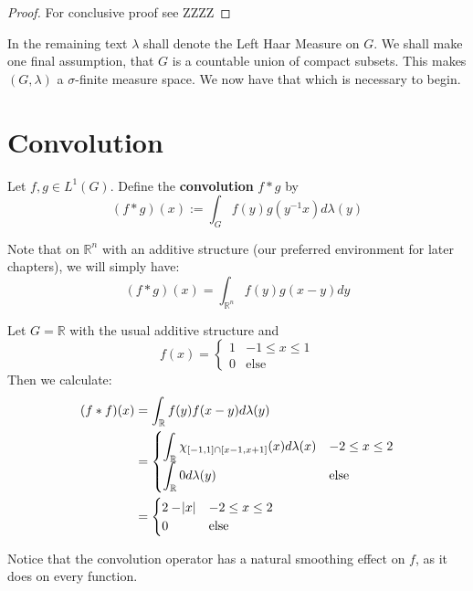 \begin{proof}
For conclusive proof see ZZZZ
\end{proof}

In the remaining text $\lambda$ shall denote the Left Haar Measure on $G$. We shall make one final assumption, that $G$ is a countable union of compact subsets. This makes $(G,\lambda)$ a $\sigma$-finite measure space. We now have that which is necessary to begin.
	
\section{Convolution}

\begin{definition}
 Let $f,g \in L^1(G)$. Define the \textbf{convolution} $f*g$ by
\begin{equation}
 (f*g)(x) := \int_G f(y)g(y^{-1}x) d\lambda(y)
\end{equation}
\end{definition}

\begin{remark}
Note that on $\mathbb{R}^n$ with an additive structure (our preferred environment for later chapters), we will simply have:
\begin{equation*}
 (f*g)(x) = \int_{\mathbb{R}^n} f(y)g(x-y) dy
\end{equation*}
\end{remark}

\begin{example}
Let $G = \mathbb{R}$ with the usual additive structure and 
\begin{equation}
f(x) = \begin{cases}
1 & -1 \leq x \leq 1 \\
0 & \text{else}
\end{cases}
\end{equation}
Then we calculate:
\begin{align*}
(f \ast f)(x) &= \int_\mathbb{R} f(y)f(x-y) d\lambda(y) \\
&= 
\begin{cases}
\displaystyle
\int_\mathbb{R} \chi_{\intcc{-1,1}\cap\intcc{x-1,x+1}}(x) d\lambda(x) & -2 \leq x \leq 2 \\
\displaystyle
\int_\mathbb{R} 0 d\lambda(y) & \text{else}
\end{cases} \\
&= 
\begin{cases}
\displaystyle
2-\abs{x} & -2 \leq x \leq 2 \\
\displaystyle
0 & \text{else}
\end{cases} 
\end{align*}

Notice that the convolution operator has a natural smoothing effect on $f$, as it does on every function.

\end{example}

